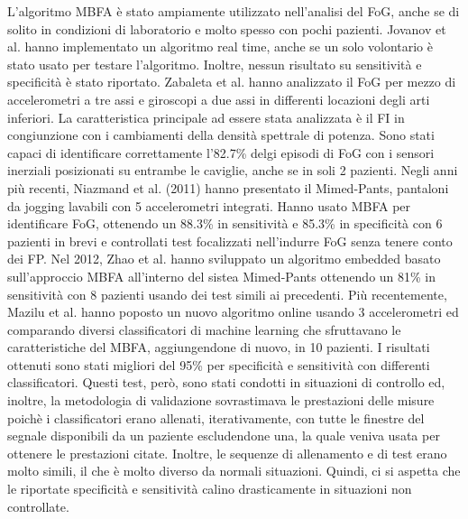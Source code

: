 L'algoritmo MBFA è stato ampiamente utilizzato nell'analisi del FoG, anche se di solito in condizioni di laboratorio e molto spesso con pochi pazienti. Jovanov et al. hanno implementato un algoritmo real time, anche se un solo volontario è stato usato per testare l'algoritmo. Inoltre, nessun risultato su sensitività e specificità è stato riportato\cite{22}. Zabaleta et al. hanno analizzato il FoG per mezzo di accelerometri a tre assi e giroscopi a due assi in differenti locazioni degli arti inferiori. La caratteristica principale ad essere stata analizzata è il FI in congiunzione con i cambiamenti della densità spettrale di potenza. Sono stati capaci di identificare correttamente l'82.7\% delgi episodi di FoG con i sensori inerziali posizionati su entrambe le caviglie, anche se in soli 2 pazienti\cite{24}.  \newline
Negli anni più recenti, Niazmand et al. (2011) hanno presentato il Mimed-Pants\cite{26}, pantaloni da jogging lavabili con 5 accelerometri integrati. Hanno usato MBFA per identificare FoG, ottenendo un 88.3\% in sensitività e 85.3\% in specificità con 6 pazienti in brevi e controllati test focalizzati nell'indurre FoG senza tenere conto dei FP. Nel 2012, Zhao et al.\cite{46} hanno sviluppato un algoritmo embedded basato sull'approccio MBFA all'interno del sistea Mimed-Pants ottenendo un 81\% in sensitività con 8 pazienti usando dei test simili ai precedenti. Più recentemente, Mazilu et al. hanno poposto un nuovo algoritmo online usando 3 accelerometri ed comparando diversi classificatori di machine learning che sfruttavano le caratteristiche del MBFA, aggiungendone di nuovo, in 10 pazienti\cite{48}. I risultati ottenuti sono stati migliori del 95\% per specificità e sensitività con differenti classificatori. Questi test, però, sono stati condotti in situazioni di controllo ed, inoltre, la metodologia di validazione sovrastimava le prestazioni delle misure poichè i classificatori erano allenati, iterativamente, con tutte le finestre del segnale disponibili da un paziente escludendone una, la quale veniva usata per ottenere le prestazioni citate. Inoltre, le sequenze di allenamento e di test erano molto simili, il che è molto diverso da normali situazioni. Quindi, ci si aspetta che le riportate specificità e sensitività calino drasticamente in situazioni non controllate. \newline
